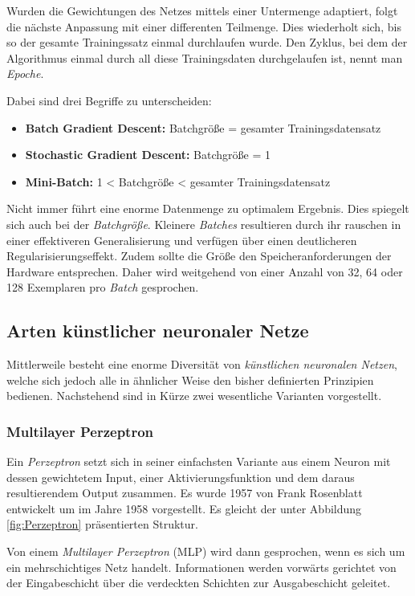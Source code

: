 Wurden die Gewichtungen des Netzes mittels einer Untermenge adaptiert, folgt die nächste Anpassung mit einer differenten Teilmenge. Dies wiederholt sich, bis so der gesamte Trainingssatz einmal durchlaufen wurde. \glqq Den Zyklus, bei dem der Algorithmus einmal durch all diese Trainingsdaten durchgelaufen ist, nennt man \textit{Epoche}.\grqq {} \cite[S. 75]{12}

Dabei sind drei Begriffe zu unterscheiden:
\begin{itemize}
	\item \textbf{Batch Gradient Descent:} Batchgröße = gesamter Trainingsdatensatz
	\item \textbf{Stochastic Gradient Descent:} Batchgröße = 1 
	\item \textbf{Mini-Batch:} 1 < Batchgröße < gesamter Trainingsdatensatz
\end{itemize}

Nicht immer führt eine enorme Datenmenge zu optimalem Ergebnis. Dies spiegelt sich auch bei der \textit{Batchgröße}. Kleinere \textit{Batches} resultieren durch ihr rauschen in einer effektiveren Generalisierung und verfügen über einen deutlicheren Regularisierungseffekt.
Zudem sollte die Größe den Speicheranforderungen der Hardware entsprechen. Daher wird weitgehend von einer Anzahl von 32, 64 oder 128 Exemplaren pro \textit{Batch} gesprochen.

\cite[vgl.][]{25, 26}

\subsection{Arten künstlicher neuronaler Netze}
Mittlerweile besteht eine enorme Diversität von \textit{künstlichen neuronalen Netzen}, welche sich jedoch alle in ähnlicher Weise den bisher definierten Prinzipien bedienen.
Nachstehend sind in Kürze zwei wesentliche Varianten vorgestellt.

\subsubsection{Multilayer Perzeptron}
Ein \textit{Perzeptron} setzt sich in seiner einfachsten Variante aus einem Neuron mit dessen gewichtetem Input, einer Aktivierungsfunktion und dem daraus resultierendem Output zusammen. Es wurde 1957 von Frank Rosenblatt entwickelt um im Jahre 1958 vorgestellt. Es gleicht der unter Abbildung \ref{fig:Perzeptron} präsentierten Struktur.

Von einem \textit{Multilayer Perzeptron} (MLP) wird dann gesprochen, wenn es sich um ein mehrschichtiges Netz handelt. Informationen werden vorwärts gerichtet von der Eingabeschicht über die verdeckten Schichten zur Ausgabeschicht geleitet. 

